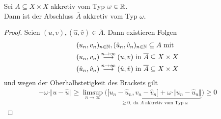 \begin{lemma}
Sei $A\subseteq X\times X$ akkretiv vom Typ $\omega\in\mathbb{R}$.\\
Dann ist der Abschluss $\overline{A}$ akkretiv vom Typ $\omega$.
\end{lemma}
\begin{proof}
Seien $(u,v),(\hat{u},\hat{v})\in\overline{A}$. Dann existieren Folgen 
\begin{align*}
&(u_n,v_n)_{n\in\mathbb{N}},(\hat{u}_n,\hat{v}_n)_{n\in\mathbb{N}}\subseteq A\text{ mit }\\
&(u_n,v_n)
\stackrel{n\to\infty}{\longrightarrow}
(u,v)\text{ in } \overline{A} \subseteq X\times X\\
&(\hat{u}_n,\hat{v}_n)
\stackrel{n\to\infty}{\longrightarrow}
(\hat{u},\hat{v})\text{ in } \overline{A} \subseteq X\times X
\end{align*}
und wegen der Oberhalbstetigkeit des Brackets gilt
\begin{align*}
[u-\hat{u},v-\hat{v}]+\omega\cdot\Vert u-\hat{u}\Vert
\geq
\limsup\limits_{n\to\infty}\Big(\underbrace{\big[ u_n-\hat{u}_n,v_n-\hat{v}_n\big]+\omega\cdot\Vert u_n-\hat{u}_n\Vert}_{\geq0,\text{ da $A$ akkretiv vom Typ $\omega$}}\Big)
\geq0
\end{align*}
\end{proof}

